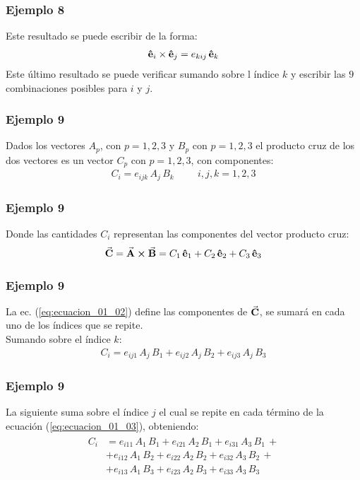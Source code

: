 \documentclass[12pt]{beamer}
\begin{document}
\begin{frame}
\frametitle{Ejemplo 8}
Este resultado se puede escribir de la forma:
\begin{align*}
\vu{e}_{i} \times \vu{e}_{j} = e_{kij} \, \vu{e}_{k}
\end{align*}
Este último resultado se puede verificar sumando sobre l índice $k$ y escribir las $9$ combinaciones posibles para $i$ y $j$.
\end{frame}
\begin{frame}
\frametitle{Ejemplo 9}
Dados los vectores $A_{p}$, con $p = 1, 2, 3$ y $B_{p}$ con $p = 1, 2, 3$ el producto cruz de los dos vectores es un vector $C_{p}$ con $p = 1, 2, 3$, con componentes:
\begin{align}
C_{i} = e_{ijk} \, A_{j} \, B_{k} \hspace{1cm} i, j, k = 1, 2, 3
\label{eq:ecuacion_01_02}
\end{align}
\end{frame}
\begin{frame}
\frametitle{Ejemplo 9}
Donde las cantidades $C_{i}$ representan las componentes del vector producto cruz:
\begin{align*}
\va{C} = \va{A} \cp \va{B} = C_{1} \, \vu{e}_{1} + C_{2} \, \vu{e}_{2} + C_{3} \, \vu{e}_{3} 
\end{align*}
\end{frame}
\begin{frame}
\frametitle{Ejemplo 9}
La ec. (\ref{eq:ecuacion_01_02}) define las componentes de $\va{C}$, se sumará en cada uno de los índices que
se repite.
\\
\bigskip
\pause
Sumando sobre el índice $k$:
\begin{align}
C_{i} = e_{ij1} \, A_{j} \, B_{1} + e_{ij2} \, A_{j} \, B_{2} + e_{ij3} \, A_{j} \, B_{3}
\label{eq:ecuacion_01_03}     
\end{align}
\end{frame}
\begin{frame}
\frametitle{Ejemplo 9}
La siguiente suma sobre el índice $j$ el cual se repite en cada término de la ecuación (\ref{eq:ecuacion_01_03}), obteniendo:
\begin{align}
\begin{aligned}
C_{i} &= e_{i11} \, A_{1} \, B_{1} + e_{i21} \, A_{2} \, B_{1} + e_{i31} \, A_{3} \, B_{1} \, + \\[0.5em]
&+ e_{i12} \, A_{1} \, B_{2} + e_{i22} \, A_{2} \, B_{2} + e_{i32} \, A_{3} \, B_{2} \, + \\[0.5em]
&+ e_{i13} \, A_{1} \, B_{3} + e_{i23} \, A_{2} \, B_{3} + e_{i33} \, A_{3} \, B_{3}
\end{aligned}
\label{eq:ecuacion_01_04}
\end{align}
\end{frame}
\end{document}
